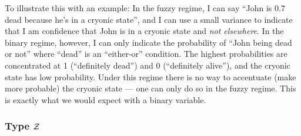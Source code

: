 

To illustrate this with an example:  In the fuzzy regime, I can say ``John is 0.7 dead because he's in a cryonic state'', and I can use a small variance to indicate that I am confidence that John is in a cryonic state and \textit{not elsewhere}.  In the binary regime, however, I can only indicate the probability of ``John being dead or not'' where ``dead'' is an ``either-or'' condition.  The highest probabilities are concentrated at 1 (``definitely dead'') and 0 (``definitely alive''), and the cryonic state has low probability.  Under this regime there is no way to accentuate (make more probable) the cryonic state --- one can only do so in the fuzzy regime.  This is exactly what we would expect with a binary variable.



\subsubsection{Type $\mathcal{Z}$}

